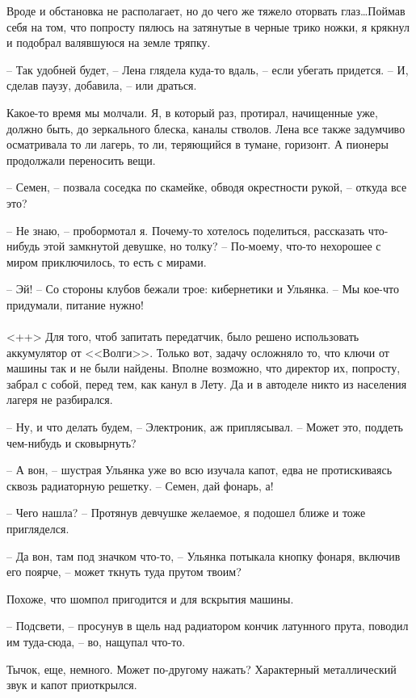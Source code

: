 \documentclass[a4paper]{book}
\begin{document}
Вроде и обстановка не располагает, но до чего же тяжело оторвать глаз\ldots Поймав себя на том, что попросту пялюсь на затянутые в черные трико ножки, я крякнул и подобрал валявшуюся на земле тряпку. 

-- Так удобней будет, -- Лена глядела куда-то вдаль, -- если убегать придется. -- И, сделав паузу, добавила, -- или драться.

Какое-то время мы молчали. Я, в который раз, протирал, начищенные уже, должно быть, до зеркального блеска, каналы стволов. Лена все также задумчиво осматривала то ли лагерь, то ли, теряющийся в тумане, горизонт. А пионеры продолжали переносить вещи. 

-- Семен, -- позвала соседка по скамейке, обводя окрестности рукой, -- откуда все это?

-- Не знаю, -- пробормотал я. Почему-то хотелось поделиться, рассказать что-нибудь этой замкнутой девушке, но толку? -- По-моему, что-то нехорошее с миром приключилось, то есть с мирами.

-- Эй! -- Со стороны клубов бежали трое: кибернетики и Ульянка. -- Мы кое-что придумали, питание нужно!

\paragraph{}<++>
Для того, чтоб запитать передатчик, было решено использовать аккумулятор от <<Волги>>. Только вот, задачу осложняло то, что ключи от машины так и не были найдены. Вполне возможно, что директор их, попросту, забрал с собой, перед тем, как канул в Лету. Да и в автоделе никто из населения лагеря не разбирался.

-- Ну, и что делать будем, -- Электроник, аж приплясывал. -- Может это, поддеть чем-нибудь и сковырнуть? 

-- А вон, -- шустрая Ульянка уже во всю изучала капот, едва не протискиваясь сквозь радиаторную решетку. -- Семен, дай фонарь, а!

-- Чего нашла? -- Протянув девчушке желаемое, я подошел ближе и тоже пригляделся. 

-- Да вон, там под значком что-то, -- Ульянка потыкала кнопку фонаря, включив его поярче, --  может ткнуть туда прутом твоим?

Похоже, что шомпол пригодится и для вскрытия машины.

-- Подсвети, -- просунув в щель над радиатором кончик латунного прута, поводил им туда-сюда,  -- во, нащупал что-то. 

Тычок, еще, немного. Может по-другому нажать? Характерный металлический звук и капот приоткрылся. 
\end{document}
